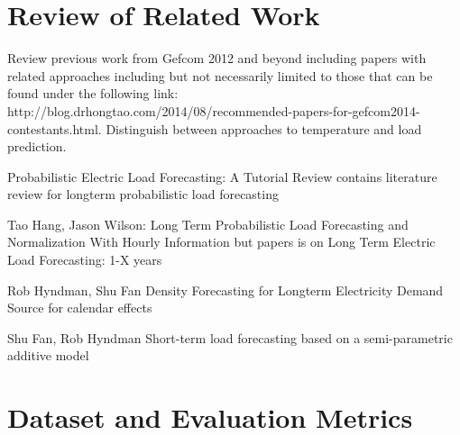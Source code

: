 \documentclass[conference]{IEEEtran}
\begin{document}


\section{Review of Related Work}
Review previous work from Gefcom 2012 and beyond including papers with related approaches including but not necessarily limited to those that can be found under the following link: http://blog.drhongtao.com/2014/08/recommended-papers-for-gefcom2014-contestants.html. Distinguish between approaches to temperature and load prediction.\par
Probabilistic Electric Load Forecasting: A Tutorial Review
contains literature review for longterm probabilistic load forecasting

Tao Hang, Jason Wilson:
Long Term Probabilistic Load Forecasting and Normalization With Hourly Information
but papers is on Long Term Electric Load Forecasting: 1-X years \cite{Hong2014Normalization}

Rob Hyndman, Shu Fan
Density Forecasting for Longterm Electricity Demand
Source for calendar effects \cite{Hyndman2010}

Shu Fan, Rob Hyndman
Short-term load forecasting based on a semi-parametric additive model \cite{Fan2010}

\section{Dataset and Evaluation Metrics}
\end{document}
